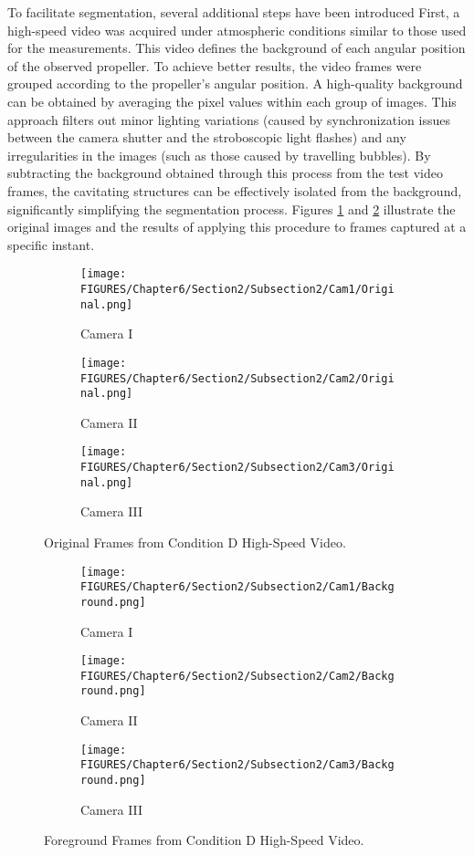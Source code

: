 To facilitate segmentation, several additional steps have been introduced
First, a high-speed video was acquired under atmospheric conditions similar to those used for the measurements. This video defines the background of each angular position of the observed propeller. To achieve better results, the video frames were grouped according to the propeller's angular position.
A high-quality background can be obtained by averaging the pixel values within each group of images. This approach filters out minor lighting variations (caused by synchronization issues between the camera shutter and the stroboscopic light flashes) and any irregularities in the images (such as those caused by travelling bubbles).
By subtracting the background obtained through this process from the test video frames, the cavitating structures can be effectively isolated from the background, significantly simplifying the segmentation process.
Figures \ref{fig:Original} and \ref{fig:Background} illustrate the original images and the results of applying this procedure to frames captured at a specific instant.

\begin{figure}[htbp]
    \centering
    \begin{subfigure}{0.32\textwidth}
        \centering
        \texttt{[image: FIGURES/Chapter6/Section2/Subsection2/Cam1/Original.png]}
        \caption{Camera I}
    \end{subfigure}
    \begin{subfigure}{0.32\textwidth}
        \centering
        \texttt{[image: FIGURES/Chapter6/Section2/Subsection2/Cam2/Original.png]}
        \caption{Camera II}
    \end{subfigure}
    \begin{subfigure}{0.32\textwidth}
        \centering
        \texttt{[image: FIGURES/Chapter6/Section2/Subsection2/Cam3/Original.png]}
        \caption{Camera III}
    \end{subfigure}
    \caption{Original Frames from Condition D High-Speed Video.}
    \label{fig:Original}
\end{figure}

\begin{figure}[htbp]
    \centering
    \begin{subfigure}{0.32\textwidth}
        \centering
        \texttt{[image: FIGURES/Chapter6/Section2/Subsection2/Cam1/Background.png]}
        \caption{Camera I}
    \end{subfigure}
    \begin{subfigure}{0.32\textwidth}
        \centering
        \texttt{[image: FIGURES/Chapter6/Section2/Subsection2/Cam2/Background.png]}
        \caption{Camera II}
    \end{subfigure}
    \begin{subfigure}{0.32\textwidth}
        \centering
        \texttt{[image: FIGURES/Chapter6/Section2/Subsection2/Cam3/Background.png]}
        \caption{Camera III}
    \end{subfigure}
    \caption{Foreground Frames from Condition D High-Speed Video.}
    \label{fig:Background}
\end{figure}

